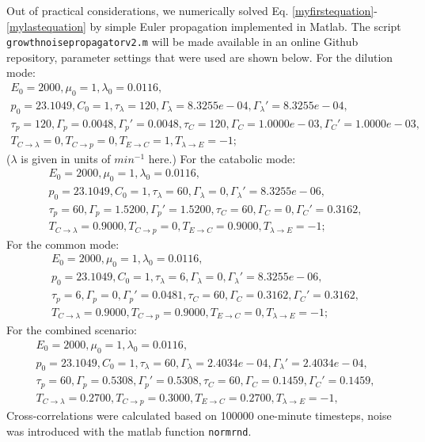 Out of practical considerations, we numerically solved Eq. \ref{myfirstequation}-\ref{mylastequation} by simple Euler propagation implemented in Matlab.
%
The script \texttt{growthnoisepropagatorv2.m} will be made available in an online Github repository, parameter settings that were used are shown below.
%
For the dilution mode: 
\begin{gather*}
E_0= 2000,
\mu_0= 1,
\lambda_0= 0.0116, 
\nonumber \\ p_0= 23.1049, 
C_0= 1,
\tau_\lambda= 120,
\Gamma_\lambda= 8.3255e-04,
\Gamma_\lambda'= 8.3255e-04,
\nonumber \\ \tau_p= 120,
\Gamma_p= 0.0048,
\Gamma_p'= 0.0048,
\tau_C= 120,
\Gamma_C= 1.0000e-03,
\Gamma_C'= 1.0000e-03,
\nonumber \\ T_{C\rightarrow\lambda}= 0,
T_{C\rightarrow{p}}= 0,
T_{E\rightarrow{C}}= 1,
T_{\lambda\rightarrow{E}}= -1;
\end{gather*}
%
($\lambda$ is given in units of $min^{-1}$ here.)
For the catabolic mode: 
\begin{gather*}
E_0= 2000,
\mu_0= 1,
\lambda_0= 0.0116,
\nonumber \\ p_0= 23.1049,
C_0= 1,
\tau_\lambda= 60,
\Gamma_\lambda= 0,
\Gamma_\lambda'= 8.3255e-06,
\nonumber \\ \tau_p= 60,
\Gamma_p= 1.5200,
\Gamma_p'= 1.5200,
\tau_C= 60,
\Gamma_C= 0,
\Gamma_C'= 0.3162,
\nonumber \\ T_{C\rightarrow\lambda}= 0.9000,
T_{C\rightarrow{p}}= 0,
T_{E\rightarrow{C}}= 0.9000,
T_{\lambda\rightarrow{E}}= -1;
\end{gather*}
For the common mode: 
\begin{gather*}
E_0= 2000,
\mu_0= 1,
\lambda_0= 0.0116,
\nonumber \\p_0= 23.1049,
C_0= 1,
\tau_\lambda= 6,
\Gamma_\lambda= 0,
\Gamma_\lambda'= 8.3255e-06,
\nonumber \\ \tau_p= 6,
\Gamma_p= 0,
\Gamma_p'= 0.0481,
\tau_C= 60,
\Gamma_C= 0.3162,
\Gamma_C'= 0.3162,
\nonumber \\ T_{C\rightarrow\lambda}= 0.9000,
T_{C\rightarrow{p}}= 0.9000,
T_{E\rightarrow{C}}= 0,
T_{\lambda\rightarrow{E}}= -1;
\end{gather*}
For the combined scenario: 
\begin{gather*}
E_0= 2000,
\mu_0= 1,
\lambda_0= 0.0116,
\nonumber \\p_0= 23.1049,
C_0= 1,
\tau_\lambda= 60,
\Gamma_\lambda= 2.4034e-04,
\Gamma_\lambda'= 2.4034e-04,
\nonumber \\ \tau_p= 60,
\Gamma_p= 0.5308,
\Gamma_p'= 0.5308,
\tau_C= 60,
\Gamma_C= 0.1459,
\Gamma_C'= 0.1459,
\nonumber \\ T_{C\rightarrow\lambda}= 0.2700,
T_{C\rightarrow{p}}= 0.3000,
T_{E\rightarrow{C}}= 0.2700,
T_{\lambda\rightarrow{E}}= -1,
\end{gather*}
%
Cross-correlations were calculated based on 100000 one-minute timesteps, noise was introduced with the matlab function \texttt{normrnd}.

